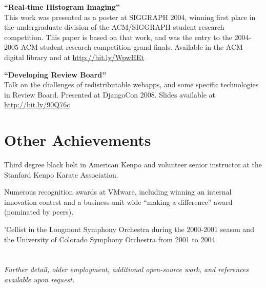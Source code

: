 \documentclass[margin,line]{resume}
\begin{document}
\begin{resume}
    {\bf``Real-time Histogram Imaging''} \vspace{2mm}\\
    This work was presented as a poster at SIGGRAPH 2004, winning first place in
    the undergraduate division of the ACM/SIGGRAPH student research competition.
    This paper is based on that work, and was the entry to the 2004-2005 ACM
    student research competition grand finals. Available in the ACM digital
    library and at \href{http://bit.ly/WpwHEt}{http://bit.ly/WpwHEt}

    \ifcv
        {\bf``Developing Review Board''} \vspace{2mm}\\
        Talk on the challenges of redistributable webapps, and some specific
        technologies in Review Board. Presented at DjangoCon 2008. Slides
        available at \href{http://bit.ly/90Q76c}{http://bit.ly/90Q76c}
    \fi

    \ifcv
        \newpage
    \fi

    \section{\mysidestyle Other Achievements}

    \begin{list2}
    \item Third degree black belt in American Kenpo and volunteer senior instructor
          at the Stanford Kenpo Karate Association.
    \item Numerous recognition awards at VMware, including winning an internal
          innovation contest and a business-unit wide ``making a difference''
          award (nominated by peers).
    \ifcv
        \item 'Cellist in the Longmont Symphony Orchestra during the 2000-2001
              season and the University of Colorado Symphony Orchestra from 2001
              to 2004.
    \fi
    \end{list2}


    \ifcv
    \else
        \section{}
        {\sl Further detail, older employment, additional open-source work, and references
             available upon request.}
    \fi


\end{resume}
\end{document}
